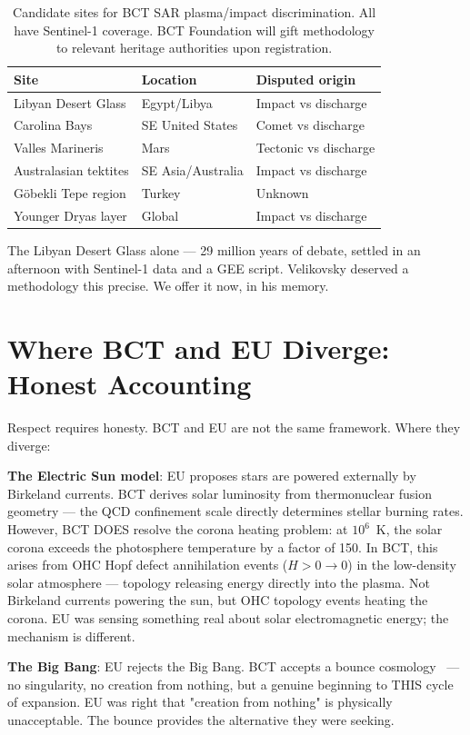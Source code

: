\documentclass[twocolumn,10pt]{article}
\begin{document}
\begin{table}[h]
\centering
\begin{tabular}{@{}lll@{}}
\toprule
Site & Location & Disputed origin \\
\midrule
Libyan Desert Glass & Egypt/Libya & Impact vs discharge \\
Carolina Bays & SE United States & Comet vs discharge \\
Valles Marineris & Mars & Tectonic vs discharge \\
Australasian tektites & SE Asia/Australia & Impact vs discharge \\
G\"{o}bekli Tepe region & Turkey & Unknown \\
Younger Dryas layer & Global & Impact vs discharge \\
\bottomrule
\end{tabular}
\caption{Candidate sites for BCT SAR plasma/impact discrimination.
All have Sentinel-1 coverage. BCT Foundation will gift methodology
to relevant heritage authorities upon registration.}
\end{table}

The Libyan Desert Glass alone --- 29 million years of debate,
settled in an afternoon with Sentinel-1 data and a GEE script.
Velikovsky deserved a methodology this precise. We offer it now,
in his memory.

\section{Where BCT and EU Diverge: Honest Accounting}

Respect requires honesty. BCT and EU are not the same framework.
Where they diverge:

\textbf{The Electric Sun model}: EU proposes stars are powered
externally by Birkeland currents. BCT derives solar luminosity
from thermonuclear fusion geometry --- the QCD confinement scale
directly determines stellar burning rates. However, BCT DOES
resolve the corona heating problem: at $10^6$~K, the solar corona
exceeds the photosphere temperature by a factor of 150. In BCT,
this arises from OHC Hopf defect annihilation events ($H > 0 \to 0$)
in the low-density solar atmosphere --- topology releasing energy
directly into the plasma. Not Birkeland currents powering the sun,
but OHC topology events heating the corona. EU was sensing something
real about solar electromagnetic energy; the mechanism is different.

\textbf{The Big Bang}: EU rejects the Big Bang. BCT accepts a bounce
cosmology~\cite{bct_l56} --- no singularity, no creation from nothing,
but a genuine beginning to THIS cycle of expansion. EU was right
that "creation from nothing" is physically unacceptable. The bounce
provides the alternative they were seeking.
\end{document}
